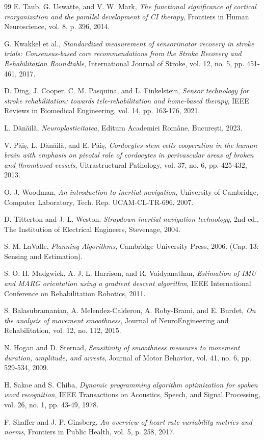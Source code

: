 \begin{thebibliography}{99}
E. Taub, G. Uswatte, and V. W. Mark, \textit{The functional significance of cortical reorganization and the parallel development of CI therapy}, Frontiers in Human Neuroscience, vol. 8, p. 396, 2014.

G. Kwakkel et al., \textit{Standardized measurement of sensorimotor recovery in stroke trials: Consensus-based core recommendations from the Stroke Recovery and Rehabilitation Roundtable}, International Journal of Stroke, vol. 12, no. 5, pp. 451-461, 2017.

D. Ding, J. Cooper, C. M. Pasquina, and L. Finkelstein, \textit{Sensor technology for stroke rehabilitation: towards tele-rehabilitation and home-based therapy}, IEEE Reviews in Biomedical Engineering, vol. 14, pp. 163-176, 2021.

L. Dănăilă, \textit{Neuroplasticitatea}, Editura Academiei Române, București, 2023.

V. Păiș, L. Dănăilă, and E. Păiș, \textit{Cordocytes-stem cells cooperation in the human brain with emphasis on pivotal role of cordocytes in perivascular areas of broken and thrombosed vessels}, Ultrastructural Pathology, vol. 37, no. 6, pp. 425-432, 2013.

O. J. Woodman, \textit{An introduction to inertial navigation}, University of Cambridge, Computer Laboratory, Tech. Rep. UCAM-CL-TR-696, 2007.

D. Titterton and J. L. Weston, \textit{Strapdown inertial navigation technology}, 2nd ed., The Institution of Electrical Engineers, Stevenage, 2004.

S. M. LaValle, \textit{Planning Algorithms}, Cambridge University Press, 2006. (Cap. 13: Sensing and Estimation).

S. O. H. Madgwick, A. J. L. Harrison, and R. Vaidyanathan, \textit{Estimation of IMU and MARG orientation using a gradient descent algorithm}, IEEE International Conference on Rehabilitation Robotics, 2011.

S. Balasubramanian, A. Melendez-Calderon, A. Roby-Brami, and E. Burdet, \textit{On the analysis of movement smoothness}, Journal of NeuroEngineering and Rehabilitation, vol. 12, no. 112, 2015.

N. Hogan and D. Sternad, \textit{Sensitivity of smoothness measures to movement duration, amplitude, and arrests}, Journal of Motor Behavior, vol. 41, no. 6, pp. 529-534, 2009.

H. Sakoe and S. Chiba, \textit{Dynamic programming algorithm optimization for spoken word recognition}, IEEE Transactions on Acoustics, Speech, and Signal Processing, vol. 26, no. 1, pp. 43-49, 1978.

F. Shaffer and J. P. Ginsberg, \textit{An overview of heart rate variability metrics and norms}, Frontiers in Public Health, vol. 5, p. 258, 2017.

\end{thebibliography}
